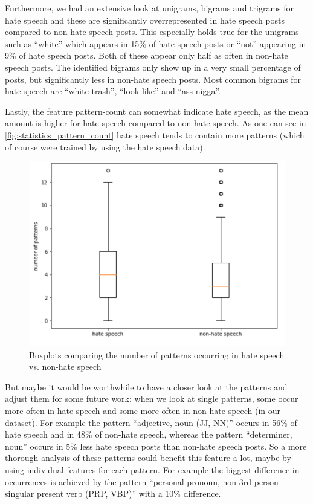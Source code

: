 \vspace{0.5cm}

Furthermore, we had an extensive look at unigrams, bigrams and trigrams for hate speech and these are significantly overrepresented in hate speech posts compared to non-hate speech posts. This especially holds true for the unigrams such as \enquote{white} which appears in 15\% of hate speech posts or \enquote{not} appearing in 9\% of hate speech posts. Both of these appear only half as often in non-hate speech posts.
The identified bigrams only show up in a very small percentage of posts, but significantly less in non-hate speech posts. Most common bigrams for hate speech are \enquote{white trash}, \enquote{look like} and \enquote{ass nigga}.

\vspace{0.5cm}

Lastly, the feature pattern-count can somewhat indicate hate speech, as the mean amount is higher for hate speech compared to non-hate speech. As one can see in \autoref{fig:statistics_pattern_count} hate speech tends to contain more patterns (which of course were trained by using the hate speech data).

\begin{figure}[ht]
	\centering
	\includegraphics[width=0.7\linewidth]{figures/statistics_pattern_count.png}
	\caption{Boxplots comparing the number of patterns occurring in hate speech vs. non-hate speech}
	\label{fig:statistics_pattern_count}
\end{figure}

But maybe it would be worthwhile to have a closer look at the patterns and adjust them for some future work: when we look at single patterns, some occur more often in hate speech and some more often in non-hate speech (in our dataset). For example the pattern \enquote{adjective, noun (JJ, NN)} occurs in 56\% of hate speech and in 48\% of non-hate speech, whereas the pattern \enquote{determiner, noun} occurs in 5\% less hate speech posts than non-hate speech posts. So a more thorough analysis of these patterns could benefit this feature a lot, maybe by using individual features for each pattern. For example the biggest difference in occurrences is achieved by the pattern \enquote{personal pronoun, non-3rd person singular present verb (PRP, VBP)} with a 10\% difference.


